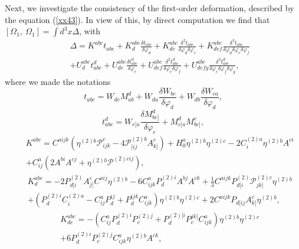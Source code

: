 \documentclass[a4paper,12pt]{article}
\begin{document}
Next, we investigate the consistency of the first-order deformation,
described by the equation (\ref{xx43}). In view of this, by direct
computation we find that $[\Omega _{1},\ \Omega _{1}]=\int d^{3}x\Delta $,
with 
\begin{eqnarray}
&&\Delta =K^{abc}t_{abc}+ K_{d}^{abc}\frac{\delta t_{abc}}{\delta \varphi
_{d}}+K_{de}^{abc}\frac{\delta ^{2}t_{abc}}{\delta \varphi _{d}\delta
\varphi _{e}}+K_{def}^{abc}\frac{\delta ^{3}t_{abc}}{\delta \varphi
_{d}\delta \varphi _{e}\delta \varphi _{f}}  \nonumber \\
&&+U_{d}^{abc}t_{abc}^{d}+ U_{de}^{abc}\frac{\delta t_{abc}^{d}}{\delta
\varphi _{e}}+U_{def}^{abc}\frac{\delta ^{2}t_{abc}^{d}}{\delta \varphi
_{e}\delta \varphi _{f}}+U_{defg}^{abc}\frac{\delta ^{3}t_{abc}^{d}}{\delta
\varphi _{e}\delta \varphi _{f}\delta \varphi _{g}},  \label{xx66}
\end{eqnarray}
where we made the notations 
\begin{equation}
t_{abc}=W_{dc}M_{ab}^{d}+W_{da}\frac{\delta W_{bc}}{\delta \varphi _{d}}%
+W_{db}\frac{\delta W_{ca}}{\delta \varphi _{d}},  \label{xx67}
\end{equation}
\begin{equation}
t_{abc}^{d}=W_{e[a}\frac{\delta M_{bc]}^{d}}{\delta \varphi _{e}}%
+M_{e[a}^{d}M_{bc]}^{e},  \label{xx68}
\end{equation}
\begin{eqnarray}
&&K^{abc}=C^{aijk}\left( \eta ^{(2)b}\mathcal{P}_{ijk}^{c}-4\mathcal{P}%
_{[ij}^{(2)b}A_{k]}^{c}\right) +H_{0}^{a}\eta ^{(2)b}\eta
^{(2)c}-2C_{i}^{(2)a}\eta ^{(2)b}A^{ci}  \nonumber \\
&&+C_{ij}^{a}\left( 2A^{bi}A^{cj}+ \eta ^{(2)b}\mathcal{P}^{(2)cij}\right) ,
\label{xx69}
\end{eqnarray}
\begin{eqnarray}
&&K_{d}^{abc}=-2P_{d[i}^{(2)}A_{j]}^{c}C^{aij}\eta
^{(2)b}-6C_{ijk}^{a}P_{d}^{(2)i}A^{bj}A^{ck}+\frac{1}{3}C^{aijk}P_{d[i}^{(2)}%
\mathcal{P}_{jk]}^{(2)c}\eta ^{(2)b}  \nonumber \\
&&+\left(
P_{d}^{(2)i}C_{i}^{(2)a}-C_{ij}^{a}P_{d}^{ij}+P_{d}^{ijk}C_{ijk}^{a}\right)
\eta ^{(2)b}\eta ^{(2)c}+2C^{aijk}P_{d[ij}A_{k]}^{c}\eta ^{(2)b},
\label{xx70}
\end{eqnarray}
\begin{eqnarray}
&&K_{de}^{abc}=-\left(
C_{ij}^{a}P_{d}^{(2)i}P_{e}^{(2)j}+P_{d}^{(2)[i}P_{e}^{jk]}C_{ijk}^{a}%
\right) \eta ^{(2)b}\eta ^{(2)c}  \nonumber \\
&&+6P_{d}^{(2)i}P_{e}^{(2)j}C_{ijk}^{a}\eta ^{(2)b}A^{ck},  \label{xx71}
\end{eqnarray}
\end{document}
